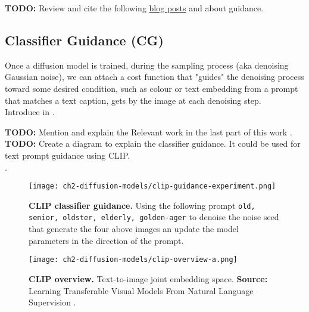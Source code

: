 \textbf{TODO:} Review and cite the following \href{https://sander.ai/2023/08/28/geometry.html}{blog posts} \cite{dieleman2022guidance} and \cite{dieleman2023geometry} about guidance.

\subsection{Classifier Guidance (CG)}

Once a diffusion model is trained, during the sampling process (aka denoising Gaussian noise), we can attach a cost function that "guides" the denoising process toward some desired condition, such as colour or text embedding from a prompt that matches a text caption, gets by the image at each denoising step.\\ Introduce in \cite{nichol2021glide}.

\textbf{TODO:} Mention and explain the Relevant work in the last part of this work \cite{Dhariwal2021DiffusionMB}.\\     

\textbf{TODO:} Create a diagram to explain the classifier guidance. It could be used for text prompt guidance using CLIP.\\ .

\begin{figure}[ht]
    \centering
    \texttt{[image: ch2-diffusion-models/clip-guidance-experiment.png]}
    \captionsetup{width=\textwidth} %
    \caption{\textbf{CLIP classifier guidance.} Using the following prompt \texttt{old, senior, oldster, elderly, golden-ager} to denoise the noise seed that generate the four above images an update the model parameters in
    the direction of the prompt.}
    \label{fig:clip-guidance-old-experiment}
  \end{figure}

\begin{figure}[ht]
    \centering
    \texttt{[image: ch2-diffusion-models/clip-overview-a.png]}
    \captionsetup{width=\textwidth} %
    \caption{\textbf{CLIP overview.} Text-to-image joint embedding space. \textbf{Source:} Learning Transferable Visual Models From Natural Language Supervision \citep{radford2021learning}.}
    \label{fig:clip-overview}
  \end{figure}

